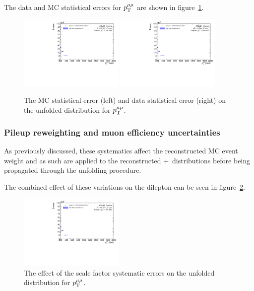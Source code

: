 The data and MC statistical errors for $p_\mathrm{T}^{\mu\mu}$ are shown in figure~\ref{fig:MCDataStatErr}.

\begin{figure}[h!]
  \centering
  \includegraphics[page=26,width=0.45\textwidth]{figures/unfoldErrPlots.pdf}
  \includegraphics[page=27,width=0.45\textwidth]{figures/unfoldErrPlots.pdf}
  \caption{The MC statistical error (left) and data statistical error (right) on the unfolded distribution for $p_\mathrm{T}^{\mu\mu}$.}
  \label{fig:MCDataStatErr}
\end{figure}

\subsubsection{Pileup reweighting and muon efficiency uncertainties}
As previously discussed, these systematics affect the reconstructed MC event weight and as such are applied to the reconstructed \powheg+\pythia~distributions before being propagated through the unfolding procedure.

The combined effect of these variations on the dilepton \pt can be seen in figure~\ref{fig:SFSystErr}.

\begin{figure}[h!]
  \centering
  \includegraphics[page=22,width=0.45\textwidth]{figures/unfoldErrPlots.pdf}
  \caption{The effect of the scale factor systematic errors on the unfolded distribution for $p_\mathrm{T}^{\mu\mu}$.}
  \label{fig:SFSystErr}
\end{figure}

